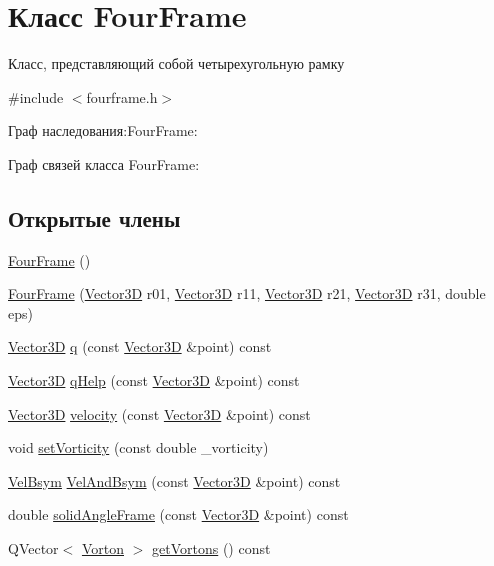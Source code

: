 \hypertarget{class_four_frame}{}\section{Класс Four\+Frame}
\label{class_four_frame}


Класс, представляющий собой четырехугольную рамку  




{\ttfamily \#include $<$fourframe.\+h$>$}



Граф наследования\+:Four\+Frame\+:


Граф связей класса Four\+Frame\+:
\subsection*{Открытые члены}
\begin{DoxyCompactItemize}
\item 
\mbox{\hyperlink{class_four_frame_a252bb2895455ee197e754daf9a9e5a8e}{Four\+Frame}} ()
\item 
\mbox{\hyperlink{class_four_frame_a9ec3cece7b4b9fc37dc5205c98cd652a}{Four\+Frame}} (\mbox{\hyperlink{class_vector3_d}{Vector3D}} r01, \mbox{\hyperlink{class_vector3_d}{Vector3D}} r11, \mbox{\hyperlink{class_vector3_d}{Vector3D}} r21, \mbox{\hyperlink{class_vector3_d}{Vector3D}} r31, double eps)
\item 
\mbox{\hyperlink{class_vector3_d}{Vector3D}} \mbox{\hyperlink{class_four_frame_af3eabfc6f9c3315f5475d66af3cf2630}{q}} (const \mbox{\hyperlink{class_vector3_d}{Vector3D}} \&point) const
\item 
\mbox{\hyperlink{class_vector3_d}{Vector3D}} \mbox{\hyperlink{class_four_frame_aa6339751887314ff05ca479255b21432}{q\+Help}} (const \mbox{\hyperlink{class_vector3_d}{Vector3D}} \&point) const
\item 
\mbox{\hyperlink{class_vector3_d}{Vector3D}} \mbox{\hyperlink{class_four_frame_a0127ebf5b1fd643a590006afdf395e30}{velocity}} (const \mbox{\hyperlink{class_vector3_d}{Vector3D}} \&point) const
\item 
void \mbox{\hyperlink{class_four_frame_a14e84439f6615d56e5fbc32d438ea2d5}{set\+Vorticity}} (const double \+\_\+vorticity)
\item 
\mbox{\hyperlink{struct_vel_bsym}{Vel\+Bsym}} \mbox{\hyperlink{class_four_frame_a950100331ec16cb70fc8d89fce01e84f}{Vel\+And\+Bsym}} (const \mbox{\hyperlink{class_vector3_d}{Vector3D}} \&point) const
\item 
double \mbox{\hyperlink{class_four_frame_ad48011ddf75d8af53e02cb51145701bf}{solid\+Angle\+Frame}} (const \mbox{\hyperlink{class_vector3_d}{Vector3D}} \&point) const
\item 
Q\+Vector$<$ \mbox{\hyperlink{class_vorton}{Vorton}} $>$ \mbox{\hyperlink{class_four_frame_a52bff30c98e07de59f17234fc5af03e0}{get\+Vortons}} () const
\end{DoxyCompactItemize}
